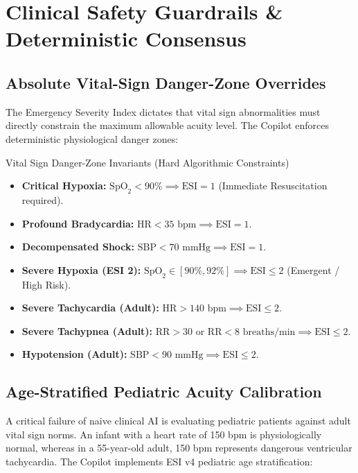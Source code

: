 \documentclass[11pt,a4paper]{article}
\begin{document}
\section{Clinical Safety Guardrails \& Deterministic Consensus}

\subsection{Absolute Vital-Sign Danger-Zone Overrides}
The Emergency Severity Index dictates that vital sign abnormalities must directly constrain the maximum allowable acuity level. The Copilot enforces deterministic physiological danger zones:

\begin{alertbox}{Vital Sign Danger-Zone Invariants (Hard Algorithmic Constraints)}
\begin{itemize}[leftmargin=1.2em]
    \item \textbf{Critical Hypoxia:} $\text{SpO}_2 < 90\% \implies \text{ESI} = 1$ (Immediate Resuscitation required).
    \item \textbf{Profound Bradycardia:} $\text{HR} < 35\text{ bpm} \implies \text{ESI} = 1$.
    \item \textbf{Decompensated Shock:} $\text{SBP} < 70\text{ mmHg} \implies \text{ESI} = 1$.
    \item \textbf{Severe Hypoxia (ESI 2):} $\text{SpO}_2 \in [90\%, 92\%] \implies \text{ESI} \le 2$ (Emergent / High Risk).
    \item \textbf{Severe Tachycardia (Adult):} $\text{HR} > 140\text{ bpm} \implies \text{ESI} \le 2$.
    \item \textbf{Severe Tachypnea (Adult):} $\text{RR} > 30\text{ or } \text{RR} < 8\text{ breaths/min} \implies \text{ESI} \le 2$.
    \item \textbf{Hypotension (Adult):} $\text{SBP} < 90\text{ mmHg} \implies \text{ESI} \le 2$.
\end{itemize}
\end{alertbox}

\subsection{Age-Stratified Pediatric Acuity Calibration}
A critical failure of naive clinical AI is evaluating pediatric patients against adult vital sign norms. An infant with a heart rate of 150 bpm is physiologically normal, whereas in a 55-year-old adult, 150 bpm represents dangerous ventricular tachycardia. The Copilot implements ESI v4 pediatric age stratification:
\end{document}

